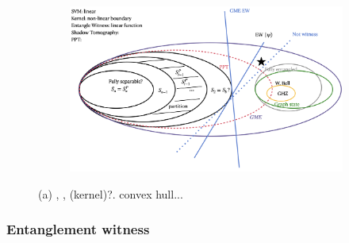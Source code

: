 \documentclass[
10pt,
aps,
pra,
linenumbers,
floatfix,
]{revtex4-2}
\theoremstyle{plain}
\theoremstyle{definition}
\begin{document}
\begin{figure}[!ht]
	\centering
	\begin{subfigure}{0.6\textwidth}
		\centering
		\includegraphics[width=.9\linewidth]{diagram.png}
	\end{subfigure}
	\caption{(a) , ,  (kernel)?. convex hull... }
	\label{fig:entangle}
\end{figure}

\subsubsection{Entanglement witness}\label{sec:entanglement_witness}
\end{document}
